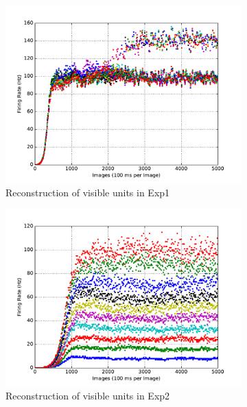 \begin{figure}
\begin{subfigure}[t]{0.4\textwidth}
		\includegraphics[width=\textwidth]{pics_sdlm/10_exp_SRBM_Orig/exp1_recon_s.pdf}
		\caption{Reconstruction of visible units in Exp1}
	\end{subfigure}
	\begin{subfigure}[t]{0.4\textwidth}
		\includegraphics[width=\textwidth]{pics_sdlm/10_exp_SRBM_Orig/exp2_recon_s.pdf}
		\caption{Reconstruction of visible units in Exp2}
	\end{subfigure}\\
	\begin{subfigure}[t]{0.4\textwidth}

\end{subfigure}
\end{figure}
